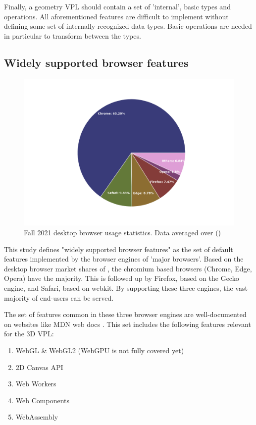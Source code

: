 Finally, a geometry VPL should contain a set of 'internal', basic types and operations.
All aforementioned features are difficult to implement without defining some set of internally recognized data types. 
Basic operations are needed in particular to transform between the types.


\subsection{Widely supported browser features}

\begin{figure}
  \centering
  \graphicspath{ {../../assets/plots/browser-usage/} }
  \includegraphics[width=0.7\linewidth]{plot.png}
  \caption[Browser usage]{Fall 2021 desktop browser usage statistics. Data averaged over (\citep{dashiki_simple_2020,w3counter_global_2020,the_netmarketshare_team_browser_2020,statcounter_global_stats_browser_2020})}
  \label{fig:browser-usage}
\end{figure}

This study defines "widely supported browser features" as the set of default features implemented by the browser engines of 'major browsers'. 
Based on the desktop browser market shares of , the chromium based browsers (Chrome, Edge, Opera) have the majority. 
This is followed up by Firefox, based on the Gecko engine, and Safari, based on webkit. 
By supporting these three engines, the vast majority of end-users can be served.

The set of features common in these three browser engines are well-documented on websites like MDN web docs \citep{mozilla_mdn_2022}. 
This set includes the following features relevant for the 3D VPL:
\begin{enumerate}[-]
  \item WebGL \& WebGL2 (WebGPU is not fully covered yet)
  \item 2D Canvas API
  \item Web Workers
  \item Web Components
  \item WebAssembly
\end{enumerate}


